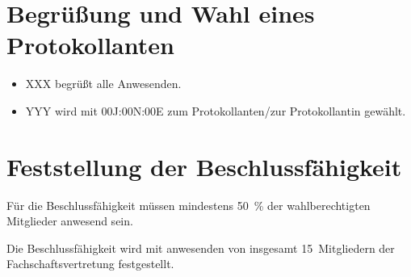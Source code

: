 \documentclass[sitzung=fsv,entwurf]{fsphys-protokoll}
\begin{document}
\section{Begrüßung und Wahl eines Protokollanten}
\begin{itemize}
	\item XXX begrüßt alle Anwesenden.
	\item YYY wird mit 00J:00N:00E zum Protokollanten/zur Protokollantin gewählt.
\end{itemize}

\section{Feststellung der Beschlussfähigkeit}
Für die Beschlussfähigkeit müssen mindestens \SI{50}{\percent} der wahlberechtigten Mitglieder anwesend sein.

Die Beschlussfähigkeit wird mit {\protokollanzahlanwesend} anwesenden von insgesamt 15~Mitgliedern der Fachschaftsvertretung festgestellt.

\end{document}
